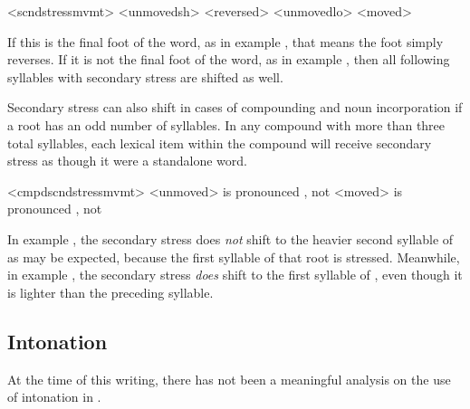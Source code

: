 \pex<scndstressmvmt>
	\a<unmovedsh>    
	\a<reversed>    
	\a<unmovedlo>    
	\a<moved>    
\xe

If this is the final foot of the word, as in example , that means the foot simply reverses. If it is not the final foot of the word, as in example , then all following syllables with secondary stress are shifted as well.

Secondary stress can also shift in cases of compounding and noun incorporation if a root has an odd number of syllables. In any compound with more than three total syllables, each lexical item within the compound will receive secondary stress as though it were a standalone word.

\pex<cmpdscndstressmvmt>
	\a<unmoved>    is pronounced , not 
	\a<moved>    is pronounced , not 
\xe

In example , the secondary stress does \emph{not} shift to the heavier second syllable of  as may be expected, because the first syllable of that root is stressed. Meanwhile, in example , the secondary stress \emph{does} shift to the first syllable of , even though it is lighter than the preceding syllable.


\subsection{Intonation}
\label{sec:intonation}

At the time of this writing, there has not been a meaningful analysis on the use of intonation in \lang{}.

